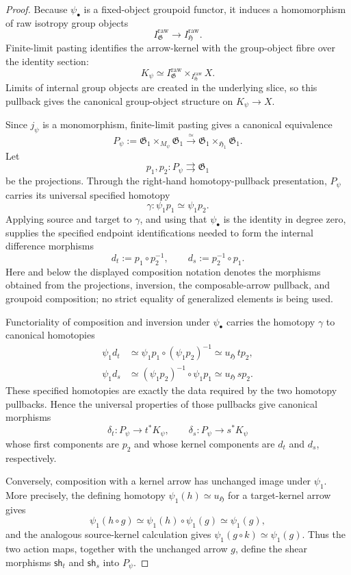 \begin{proof}
Because $\psi_\bullet$ is a fixed-object groupoid functor, it induces a
homomorphism of raw isotropy group objects
\[
    I^{\mathrm{raw}}_{\mathfrak G}
    \longrightarrow
    I^{\mathrm{raw}}_{\mathfrak H}.
\]
Finite-limit pasting identifies the arrow-kernel with the group-object fibre
over the identity section:
\[
    K_\psi
    \simeq
    I^{\mathrm{raw}}_{\mathfrak G}
    \times_{I^{\mathrm{raw}}_{\mathfrak H}}
    X.
\]
Limits of internal group objects are created in the underlying slice, so this
pullback gives the canonical group-object structure on $K_\psi\to X$.

Since $j_\psi$ is a monomorphism, finite-limit pasting gives a canonical
equivalence
\[
    P_\psi
    :=
    \mathfrak G_1\times_{M_\psi}\mathfrak G_1
    \xrightarrow{\simeq}
    \mathfrak G_1\times_{\mathfrak H_1}\mathfrak G_1.
\]
Let
\[
    p_1,p_2:P_\psi\rightrightarrows\mathfrak G_1
\]
be the projections.  Through the right-hand homotopy-pullback presentation,
$P_\psi$ carries its universal specified homotopy
\[
    \gamma:
    \psi_1p_1
    \simeq
    \psi_1p_2.
\]
Applying source and target to $\gamma$, and using that $\psi_\bullet$ is the
identity in degree zero, supplies the specified endpoint identifications
needed to form the internal difference morphisms
\[
    d_t:=p_1\circ p_2^{-1},
    \qquad
    d_s:=p_2^{-1}\circ p_1.
\]
Here and below the displayed composition notation denotes the morphisms
obtained from the projections, inversion, the composable-arrow pullback, and
groupoid composition; no strict equality of generalized elements is being
used.

Functoriality of composition and inversion under $\psi_\bullet$ carries the
homotopy $\gamma$ to canonical homotopies
\[
\begin{aligned}
    \psi_1d_t
    &\simeq
    \psi_1p_1\circ(\psi_1p_2)^{-1}
    \simeq
    u_{\mathfrak H}\,t p_2,\\
    \psi_1d_s
    &\simeq
    (\psi_1p_2)^{-1}\circ\psi_1p_1
    \simeq
    u_{\mathfrak H}\,s p_2.
\end{aligned}
\]
These specified homotopies are exactly the data required by the two homotopy
pullbacks.  Hence the universal properties of those pullbacks give canonical
morphisms
\[
    \delta_t:
    P_\psi\longrightarrow t^*K_\psi,
    \qquad
    \delta_s:
    P_\psi\longrightarrow s^*K_\psi
\]
whose first components are $p_2$ and whose kernel components are $d_t$ and
$d_s$, respectively.

Conversely, composition with a kernel arrow has unchanged image under
$\psi_1$.  More precisely, the defining homotopy
$\psi_1(h)\simeq u_{\mathfrak H}$ for a target-kernel arrow gives
\[
    \psi_1(h\circ g)
    \simeq
    \psi_1(h)\circ\psi_1(g)
    \simeq
    \psi_1(g),
\]
and the analogous source-kernel calculation gives
$\psi_1(g\circ k)\simeq\psi_1(g)$.  Thus the two action maps, together with
the unchanged arrow $g$, define the shear morphisms
$\mathsf{sh}_t$ and $\mathsf{sh}_s$ into $P_\psi$.


\end{proof}
